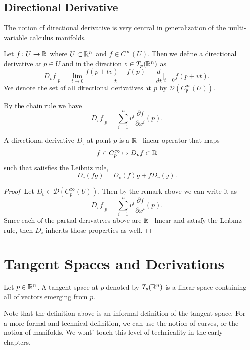 \subsection{Directional Derivative}
The notion of directional derivative is very central in generalization of the multi-variable calculus manifolds. 

\begin{definition}
	\label{def:directionalDerivative}
	Let $ f:U \to \mathbb{R} $ where $ U \subset \mathbb{R}^n $ and $ f \in C^\infty(U) $. Then we define a directional derivative at $ p\in U $ and in the direction $ v \in T_p(\mathbb{R}^n) $ as 
	\[ D_v f \big|_p = \lim_{t\to 0 } \frac{f(p + tv) - f(p)}{t} = \frac{d}{dt}\big|_{t=0} f(p+vt). \]
	We denote the set of all directional derivatives at $ p $ by $ \mathcal{D}(C_p^\infty(U)) $.
\end{definition}
\begin{remark}
	By the chain rule we have
	\[ D_v f \big|_p = \sum_{i=1}^{n} v^i \frac{\partial f}{\partial x^i}(p). \]
\end{remark}


\begin{proposition}
	A directional derivative $ D_v $ at point $ p $ is a $ \mathbb{R}-$linear operator that maps  \[f\in C_p^\infty \mapsto D_vf \in \mathbb{R}\] such that satisfies the Leibniz rule,
	\[ D_v(fg) = D_v(f)g + fD_v(g). \]
\end{proposition}
\begin{proof}
	Let $ D_v \in \mathcal{D}(C_p^\infty(U)) $. Then by the remark above we can write it as  
	\[ D_v f \big|_p = \sum_{i=1}^{n} v^i \frac{\partial f}{\partial x^i}(p). \]
	Since each of the partial derivatives above are $ \mathbb{R}-$linear and satisfy the Leibniz rule, then $ D_v $ inherits those properties as well.
\end{proof}

\section{Tangent Spaces and Derivations}

\begin{definition}
	Let $ p \in \mathbb{R}^n $. A tangent space at $ p $ denoted by $ T_p(\mathbb{R}^n) $ is a linear space containing all of vectors emerging from $ p $.
\end{definition}
\begin{remark}
	Note that the definition above is an informal definition of the tangent space. For a more formal and technical definition, we can use the notion of curves, or the notion of manifolds. We wont' touch this level of technicality in the early chapters.
\end{remark}

